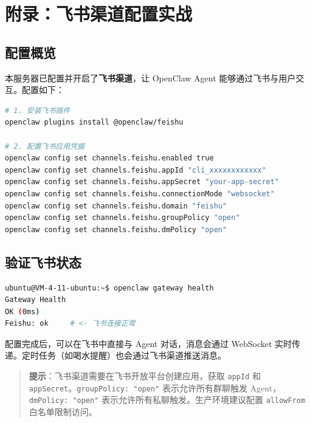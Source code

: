\clearpage

\section{附录：飞书渠道配置实战}

\subsection{配置概览}

本服务器已配置并开启了\textbf{飞书渠道}，让 OpenClaw Agent 能够通过飞书与用户交互。配置如下：

\begin{lstlisting}[language=bash]
# 1. 安装飞书插件
openclaw plugins install @openclaw/feishu

# 2. 配置飞书应用凭据
openclaw config set channels.feishu.enabled true
openclaw config set channels.feishu.appId "cli_xxxxxxxxxxxx"
openclaw config set channels.feishu.appSecret "your-app-secret"
openclaw config set channels.feishu.connectionMode "websocket"
openclaw config set channels.feishu.domain "feishu"
openclaw config set channels.feishu.groupPolicy "open"
openclaw config set channels.feishu.dmPolicy "open"
\end{lstlisting}

\subsection{验证飞书状态}

\begin{lstlisting}[language=bash]
ubuntu@VM-4-11-ubuntu:~$ openclaw gateway health
Gateway Health
OK (0ms)
Feishu: ok     # <- 飞书连接正常
\end{lstlisting}

配置完成后，可以在飞书中直接与 Agent 对话，消息会通过 WebSocket 实时传递。定时任务（如喝水提醒）也会通过飞书渠道推送消息。

\begin{quote}
\textbf{提示}：飞书渠道需要在飞书开放平台创建应用，获取 \texttt{appId} 和 \texttt{appSecret}。\texttt{groupPolicy: "open"} 表示允许所有群聊触发 Agent，\texttt{dmPolicy: "open"} 表示允许所有私聊触发。生产环境建议配置 \texttt{allowFrom} 白名单限制访问。
\end{quote}
